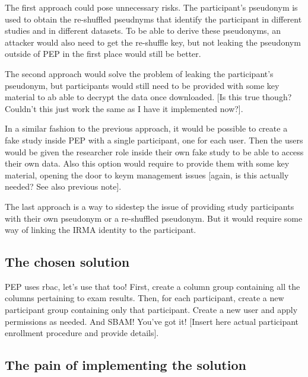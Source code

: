 \documentclass{report}
\begin{document}
The first approach could pose unnecessary risks. The participant's pseudonym is used to obtain the re-shuffled pseudnyms that identify the participant in different studies and in
different datasets. To be able to derive these pseudonyms, an attacker would also need to get the re-shuffle key, but not leaking the pseudonym outside of PEP in the first place would still be
better. \par
The second approach would solve the problem of leaking the participant's pseudonym, but participants would still need to be provided with some key material to ab able to decrypt
the data once downloaded. [Is this true though? Couldn't this just work the same as I have it implemented now?]. \par
In a similar fashion to the previous approach, it would be possible to create a fake study inside PEP with a single participant, one for each user. Then the users would be given
the researcher role inside their own fake study to be able to access their own data. Also this option would require to provide them with some key material, opening the door to keym
management issues [again, is this actually needed? See also previous note]. \par
The last approach is a way to sidestep the issue of providing study participants with their own pseudonym or a re-shuffled pseudonym. But it would require some way of linking the
IRMA identity to the participant.\par

\subsection{The chosen solution}
PEP uses rbac, let's use that too! First, create a column group containing all the columns pertaining to exam results. Then, for each participant, create a new participant group
containing only that participant. Create a new user and apply permissions as needed. And SBAM! You've got it! [Insert here actual participant enrollment procedure and provide
details].
\subsection{The pain of implementing the solution}
\fi


\printbibliography
\end{document}
